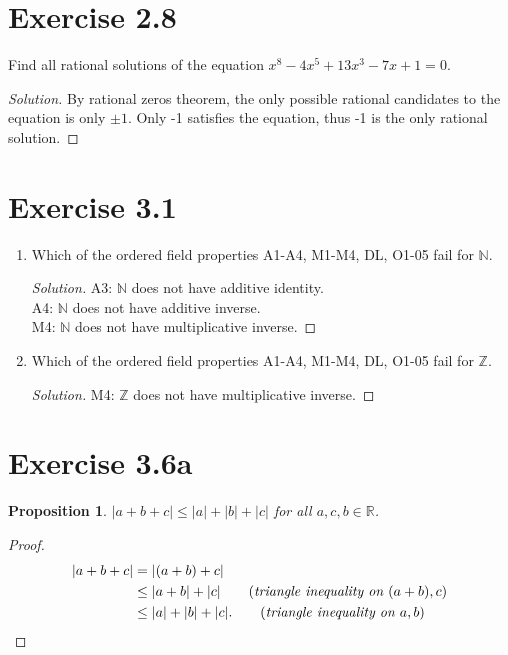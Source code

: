 \documentclass{article}
\newtheorem{proposition}[thm]{Proposition}
\begin{document}
\section*{Exercise 2.8}
Find all rational solutions of the equation $x^8 - 4x^5 + 13x^3 - 7x + 1 =0$.

\begin{proof}[Solution]
    By rational zeros theorem, the only possible rational candidates to the equation is only 
    $\pm 1$. Only -1 satisfies the equation, thus -1 is the only rational solution.
\end{proof}
\bigbreak

\section*{Exercise 3.1}
    \begin{enumerate}[label=(\alph*)]
        \item Which of the ordered field properties A1-A4, M1-M4, DL, O1-05 fail for $\mathbb{N}$.
        \begin{proof}[Solution]
            A3: $\mathbb{N}$ does not have additive identity. \\
            A4: $\mathbb{N}$ does not have additive inverse. \\
            M4: $\mathbb{N}$ does not have multiplicative inverse. 
        \end{proof}

        \item Which of the ordered field properties A1-A4, M1-M4, DL, O1-05 fail for $\mathbb{Z}$.
        \begin{proof}[Solution]
            M4: $\mathbb{Z}$ does not have multiplicative inverse.
        \end{proof}
    \end{enumerate}
\bigbreak

\section*{Exercise 3.6a}
\begin{proposition}
    $|a+b+c|\le |a|+|b|+|c|$ for all $a,c,b \in \mathbb{R}$.
\end{proposition}
\begin{proof}
    \begin{align*}
        |a+b+c| & = |(a+b)+c| \\
        & \le |a+b| + |c| \qquad (\emph{triangle inequality on } (a +b), c) \\
        & \le |a| + |b| + |c|. \qquad (\emph{triangle inequality on } a, b)
    \end{align*}
\end{proof}
\end{document}
